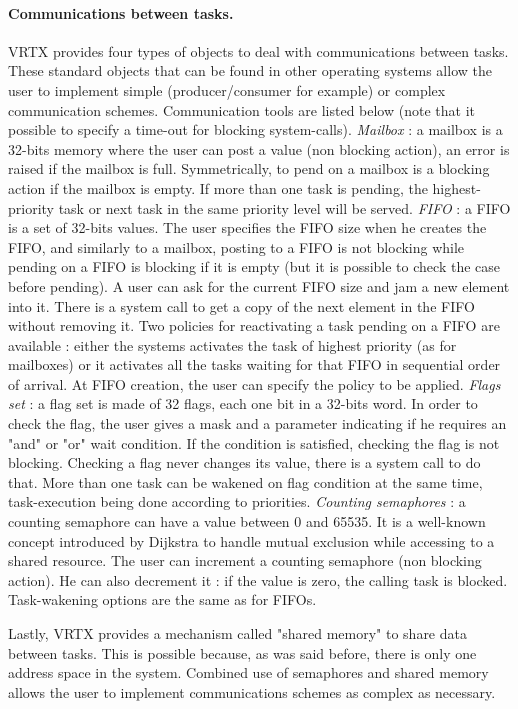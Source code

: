 \documentclass[10pt]{report}
\begin{document}
\paragraph{Communications between tasks.} VRTX provides four types of objects to deal with communications
between tasks. These standard objects that can be found in other
operating systems allow the user to implement simple
(producer/consumer for example) or complex communication schemes.
Communication tools are listed below (note that it possible to
specify a time-out for blocking system-calls). {\em Mailbox} : a
mailbox is a 32-bits memory where the user can post a value (non
blocking action), an error is raised if the mailbox is full.
Symmetrically, to pend on a mailbox is a blocking action if the
mailbox is empty. If more than one task is pending, the
highest-priority task or next task in the same priority level
will be served. {\em FIFO} :
a FIFO is a set of 32-bits values. The
user specifies the FIFO size when he creates the FIFO, and
similarly to a mailbox, posting to a FIFO is not blocking while
pending on a FIFO is blocking if it is empty (but it is possible
to check the case before pending). A user can ask for the current
FIFO size and jam a new element into it. There is a system call
to get a copy of the next element in the FIFO without removing
it. Two policies for reactivating a task pending on a FIFO are
available : either the systems activates the task of highest
priority (as for mailboxes) or it activates all the tasks waiting
for that FIFO in sequential order of arrival. At FIFO creation,
the user can specify the policy to be applied. {\em Flags set} : a
flag set is made of 32 flags, each one bit in a 32-bits word. In
order to check the flag, the user gives a mask and a parameter
indicating if he requires an "and" or "or" wait condition. If the
condition is satisfied, checking the flag is not blocking.
Checking a flag never changes its value, there is a system call
to do that. More than one task can be wakened on flag condition
at the same time, task-execution being done according to
priorities. {\em Counting semaphores} : a counting semaphore can have
a value between 0 and 65535. It is a well-known concept
introduced by Dijkstra to handle mutual exclusion while accessing
to a shared resource. The user can increment a counting semaphore
(non blocking action). He can also decrement it : if the value is
zero, the calling task is blocked. Task-wakening options are the
same as for FIFOs.

Lastly, VRTX provides a mechanism called "shared memory" to share
data between tasks. This is possible because, as was said before,
there is only one address space in the system. Combined use of
semaphores and shared memory allows the user to implement
communications schemes as complex as necessary.
\end{document}
